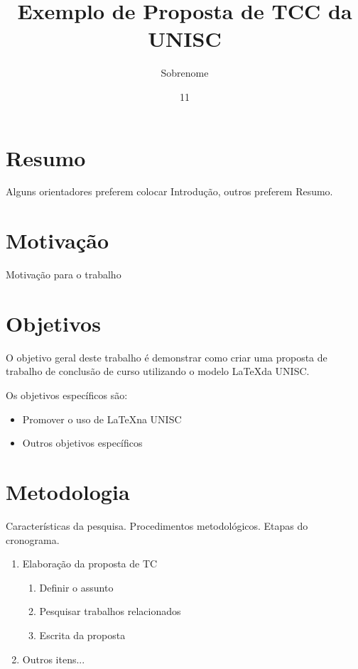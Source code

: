 \documentclass[propostatc,showlinks]{unisc}    %
\title{Exemplo de Proposta de TCC da UNISC}    %
\author{Sobrenome}{Nome Segundo Nome}          %
\date{11}{setembro}{2015}
\begin{document}
\maketitle
\tableofcontents

\chapter*{Resumo}

Alguns orientadores preferem colocar Introdução, outros preferem Resumo.

\chapter*{Motivação}

Motivação para o trabalho

\chapter*{Objetivos}

O objetivo geral deste trabalho é demonstrar como criar uma proposta de trabalho de conclusão de curso utilizando o modelo \LaTeX da UNISC.

Os objetivos específicos são:

\begin{itemize}
  \item Promover o uso de \LaTeX na UNISC
  \item Outros objetivos específicos
\end{itemize}

\chapter*{Metodologia}

Características da pesquisa. Procedimentos metodológicos. Etapas do cronograma.

\begin{enumerate}
  \item Elaboração da proposta de TC
  \begin{enumerate}
    \item Definir o assunto
    \item Pesquisar trabalhos relacionados
    \item Escrita da proposta
  \end{enumerate}
  \item Outros itens...
\end{enumerate}
\end{document}
